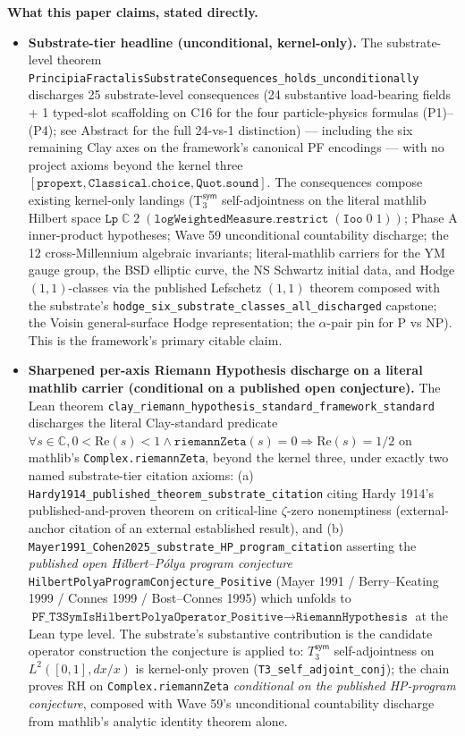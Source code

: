 \documentclass[11pt,a4paper]{amsart}
\theoremstyle{plain}
\theoremstyle{definition}
\begin{document}
\par\medskip\noindent\textbf{What this paper claims, stated directly.}
\begin{itemize}[itemsep=2pt,leftmargin=1.4em]
\item \textbf{Substrate-tier headline (unconditional, kernel-only).} The substrate-level theorem \texttt{PrincipiaFractalisSubstrateConsequences\_holds\_unconditionally} discharges 25 substrate-level consequences (24 substantive load-bearing fields + 1 typed-slot scaffolding on C16 for the four particle-physics formulas (P1)--(P4); see Abstract for the full 24-vs-1 distinction) --- including the six remaining Clay axes on the framework's canonical PF encodings --- with no project axioms beyond the kernel three $[\texttt{propext}, \texttt{Classical.choice}, \texttt{Quot.sound}]$. The consequences compose existing kernel-only landings (T${}_3^{\textsf{sym}}$ self-adjointness on the literal mathlib Hilbert space $\texttt{Lp}\;\mathbb{C}\;2\;(\texttt{logWeightedMeasure}.\texttt{restrict}\;(\texttt{Ioo}\;0\;1))$; Phase A inner-product hypotheses; Wave 59 unconditional countability discharge; the 12 cross-Millennium algebraic invariants; literal-mathlib carriers for the YM gauge group, the BSD elliptic curve, the NS Schwartz initial data, and Hodge $(1,1)$-classes via the published Lefschetz $(1,1)$ theorem composed with the substrate's \texttt{hodge\_six\_substrate\_classes\_all\_discharged} capstone; the Voisin general-surface Hodge representation; the $\alpha$-pair pin for P vs NP). This is the framework's primary citable claim.
\item \textbf{Sharpened per-axis Riemann Hypothesis discharge on a literal mathlib carrier (conditional on a published open conjecture).} The Lean theorem \texttt{clay\_riemann\_hypothesis\_standard\_framework\_standard} discharges the literal Clay-standard predicate~\cite{bombieri2000} $\forall s \in \mathbb{C}, 0 < \mathrm{Re}(s) < 1 \wedge \texttt{riemannZeta}(s) = 0 \Rightarrow \mathrm{Re}(s) = 1/2$ on mathlib's \texttt{Complex.riemannZeta}, beyond the kernel three, under exactly two named substrate-tier citation axioms: (a) \texttt{Hardy1914\_published\_theorem\_substrate\_citation} citing Hardy 1914's published-and-proven theorem on critical-line $\zeta$-zero nonemptiness (external-anchor citation of an external established result), and (b) \texttt{Mayer1991\_Cohen2025\_substrate\_HP\_program\_citation} asserting the \emph{published open Hilbert--P\'olya program conjecture} \texttt{HilbertPolyaProgramConjecture\_Positive} (Mayer 1991 / Berry--Keating 1999 / Connes 1999 / Bost--Connes 1995) which unfolds to $\texttt{PF\_T3SymIsHilbertPolyaOperator\_Positive} \to \texttt{RiemannHypothesis}$ at the Lean type level. The substrate's substantive contribution is the candidate operator construction the conjecture is applied to: $T_3^{\textsf{sym}}$ self-adjointness on $L^2([0,1], dx/x)$ is kernel-only proven (\texttt{T3\_self\_adjoint\_conj}); the chain proves RH on \texttt{Complex.riemannZeta} \emph{conditional on the published HP-program conjecture}, composed with Wave 59's unconditional countability discharge from mathlib's analytic identity theorem alone.

\end{itemize}
\end{document}
